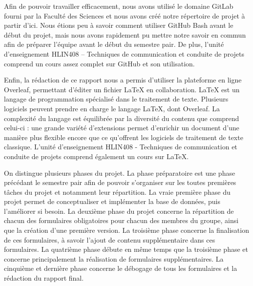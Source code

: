 \documentclass[12pt]{report}
\begin{document}
        \bigskip
        \par
        Afin de pouvoir travailler efficacement, nous avons utilisé le domaine GitLab fourni par la Faculté des Sciences et nous avons créé notre répertoire de projet à partir d’ici. Nous étions peu à savoir comment utiliser GitHub Bash avant le début du projet, mais nous avons rapidement pu mettre notre savoir en commun afin de préparer l’équipe avant le début du semestre pair. De plus, l’unité d’enseignement HLIN408 – Techniques de communication et conduite de projets comprend un cours assez complet sur GitHub et son utilisation.
        
        \bigskip
        \par
        Enfin, la rédaction de ce rapport nous a permis d’utiliser la plateforme en ligne Overleaf, permettant d’éditer un fichier LaTeX en collaboration. LaTeX est un langage de programmation spécialisé dans le traitement de texte. Plusieurs logiciels peuvent prendre en charge le langage LaTeX, dont Overleaf. La complexité du langage est équilibrée par la diversité du contenu que comprend celui-ci : une grande variété d’extensions permet d’enrichir un document d’une manière plus flexible encore que ce qu’offrent les logiciels de traitement de texte classique. L'unité d'enseignement HLIN408 - Techniques de communication et conduite de projets comprend également un cours sur LaTeX.
        
        \bigskip
        \par
        On distingue plusieurs phases du projet. La phase préparatoire est une phase précédant le semestre pair afin de pouvoir s’organiser sur les toutes premières tâches du projet et notamment leur répartition. La vraie première phase du projet permet de conceptualiser et implémenter la base de données, puis l’améliorer si besoin. La deuxième phase du projet concerne la répartition de chacun des formulaires obligatoires pour chacun des membres du groupe, ainsi que la création d’une première version. La troisième phase concerne la finalisation de ces formulaires, à savoir l’ajout de contenu supplémentaire dans ces formulaires. La quatrième phase débute en même temps que la troisième phase et concerne principalement la réalisation de formulaires supplémentaires. La cinquième et dernière phase concerne le débogage de tous les formulaires et la rédaction du rapport final.
        
\end{document}
